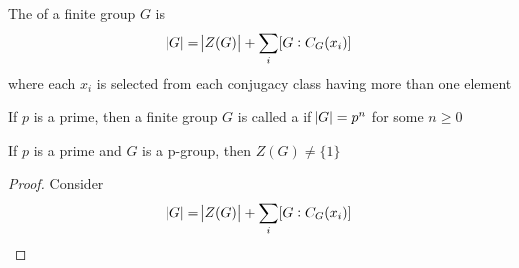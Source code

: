 \documentclass[11pt]{article}
\begin{document}
\begin{definition}[]
The  of a finite group \(G\) is
\begin{equation*}
\abs{G}=\abs{Z(G)}+\displaystyle\sum_i[G:C_G(x_i)]
\end{equation*}
where each \(x_i\) is selected from each conjugacy class having more than one element
\end{definition}

\begin{definition}[]
If \(p\) is a prime, then a finite group \(G\) is called a  if
\(\abs{G}=p^n\) for some \(n\ge 0\)
\end{definition}

\begin{theorem}[]
If \(p\) is a prime and \(G\) is a p-group, then \(Z(G)\neq\{1\}\)
\end{theorem}

\begin{proof}
Consider 
\begin{equation*}
\abs{G}=\abs{Z(G)}+\displaystyle\sum_i[G:C_G(x_i)]
\end{equation*}
\end{proof}
\end{document}
